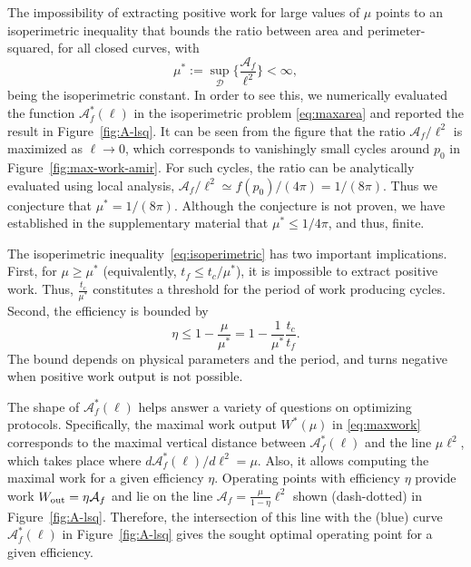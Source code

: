 \documentclass[
 reprint,
superscriptaddress,
 amsmath,amssymb,prl
 aps
]{revtex4-2}
\newcommand{\Area}{{\mathcal A}}
\newcommand{\blue}{\color{blue}}
\newcommand{\black}{\color{black}}
\begin{document}
The impossibility of extracting positive work for large values of $\mu$ points to an isoperimetric inequality that bounds the ratio between area and perimeter-squared, for all closed curves, with
\begin{equation}\label{eq:isoperimetric}
    \mu^*:=\sup_{\mathcal D}\bigg\{\frac{\Area_f}{\ell^2}\bigg\} <\infty,
\end{equation}
being the
isoperimetric constant.
In order to see this, we numerically evaluated the function $\mathcal{A}^*_f(\ell)$ in the isoperimetric problem \eqref{eq:maxarea} and reported the result in Figure~\ref{fig:A-lsq}. 
It can be seen from the figure that the ratio $\Area_f/\ell^2$ is maximized as $\ell\to 0$, which corresponds to vanishingly small cycles around $p_0$ in Figure~\ref{fig:max-work-amir}. For such cycles, the ratio can be analytically evaluated using local analysis, $
\Area_f/\ell^2\simeq f(p_0)/(4\pi)=1/(8\pi)$.
Thus we conjecture that $\mu^*= 1/(8\pi)$. Although the conjecture is not proven, we have established in the supplementary material that  $\mu^*\leq 1/4\pi$, and thus, finite.

The  isoperimetric inequality~\eqref{eq:isoperimetric} has two important implications. First, for $\mu \geq \mu^*$ (equivalently, $t_f\leq t_c/\mu^*$), it is impossible to extract positive work. Thus, $\frac{t_c}
{\mu^*}$ constitutes a threshold for the period of work producing cycles. 
Second, the efficiency is bounded by
\begin{equation*}
    \eta \leq 1-\frac{\mu}{\mu^*}= 1- \frac{1}{\mu^*}\frac{t_c}{t_f}.
\end{equation*}
The bound depends on physical parameters and the period, and turns negative when  positive work output is not possible.

The shape of $\Area^*_f(\ell)$ helps answer a variety of questions on optimizing protocols. 
Specifically, the maximal work output $W^*(\mu)$ in \eqref{eq:maxwork}
corresponds to the maximal vertical distance between  $\mathcal A_f^*(\ell)$ and the line $\mu \ell^2$, which takes place where $d\mathcal A_f^*(\ell)/d\ell^2=\mu$.
Also, it allows computing the maximal work for a given efficiency $\eta$. 
Operating points with efficiency $\eta$ provide work $W_{\rm out}=\eta \mathcal A_f$ and lie on the line $\mathcal A_f=\frac{\mu}{1-\eta}\ell^2$ shown (dash-dotted) in Figure~\ref{fig:A-lsq}. Therefore, the intersection of this line with the (blue) curve $\mathcal A_f^*(\ell)$ in Figure~\ref{fig:A-lsq} gives the sought optimal operating point for a given efficiency. 
\end{document}
